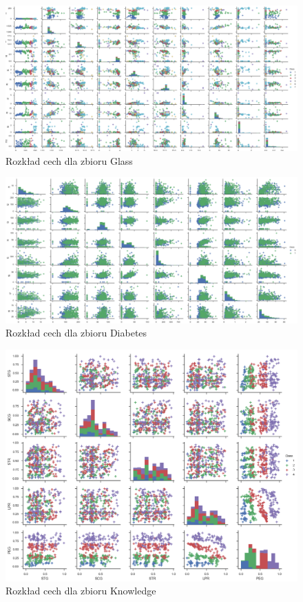 \documentclass[12pt,a4paper]{article}
\begin{document}
\begin{figure}[H]
\centering
\includegraphics[width=1\textwidth]{dsGlassCombined.png}
\caption{Rozkład cech dla zbioru Glass}
\end{figure}

\begin{figure}[H]
\centering
\includegraphics[width=1\textwidth]{dsDiabetesCombined.png}
\caption{Rozkład cech dla zbioru Diabetes}
\end{figure}

\begin{figure}[H]
\centering
\includegraphics[width=1\textwidth]{dsKnowledgeCombined.png}
\caption{Rozkład cech dla zbioru Knowledge}
\end{figure}
\end{document}
